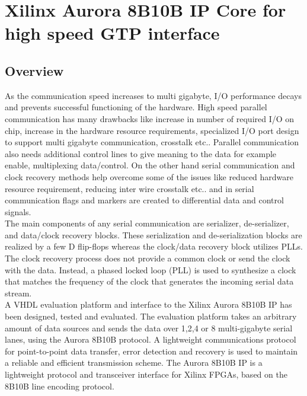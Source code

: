 \chapter{Xilinx Aurora 8B10B IP Core for high speed GTP interface}
\label{chapter4}
\section {Overview}

As the communication speed increases to multi gigabyte, I/O performance decays and prevents successful functioning of the hardware. High speed parallel communication has many drawbacks like increase in number of required I/O on chip, increase in the hardware resource requirements, specialized I/O port design to support multi gigabyte communication, crosstalk etc.. Parallel communication also needs additional control lines to give meaning to the data for example enable, multiplexing data/control. On the other hand serial communication and clock recovery methods help overcome some of the issues like reduced hardware resource requirement, reducing inter wire crosstalk etc.. and in serial communication flags and markers are created to differential data and control signals.\\

The main components of any serial communication are serializer, de-serializer, and data/clock recovery blocks. These serialization and de-serialization blocks are realized by a few D flip-flops whereas the clock/data recovery block utilizes PLLs. The clock recovery process does not provide a common clock or send the clock with the data. Instead, a phased locked loop (PLL) is used to synthesize a clock that matches the frequency of the clock that generates the incoming serial data stream.\\

A VHDL evaluation platform and interface to the Xilinx Aurora 8B10B IP has been designed, tested and evaluated. The evaluation platform takes an arbitrary amount of data sources and sends the data over 1,2,4 or 8 multi-gigabyte serial lanes, using the Aurora 8B10B protocol. A lightweight communications protocol for point-to-point data transfer, error detection and recovery is used to maintain a reliable and efficient transmission scheme. The Aurora 8B10B IP is a lightweight protocol and transceiver interface for Xilinx FPGAs, based on the 8B10B line encoding protocol.

